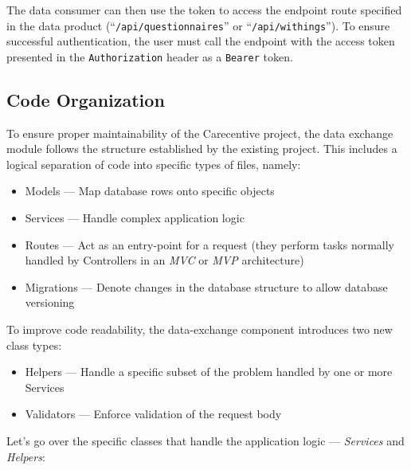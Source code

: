 The data consumer can then use the token to access the endpoint route specified in the data product (``\texttt{/api/questionnaires}'' or ``\texttt{/api/withings}'').
To ensure successful authentication, the user must call the endpoint with the access token presented in the \texttt{Authorization} header as a \texttt{Bearer} token.

\subsection{Code Organization}\label{subsec:code-organization}

To ensure proper maintainability of the Carecentive project, the data exchange module follows the structure established by the existing project.
This includes a logical separation of code into specific types of files, namely:
\begin{itemize}
    \item Models --- Map database rows onto specific objects
    \item Services --- Handle complex application logic
    \item Routes --- Act as an entry-point for a request (they perform tasks normally handled by Controllers in an \textit{MVC} or \textit{MVP} architecture)
    \item Migrations --- Denote changes in the database structure to allow database versioning
\end{itemize}

To improve code readability, the data-exchange component introduces two new class types:
\begin{itemize}
    \item Helpers --- Handle a specific subset of the problem handled by one or more Services
    \item Validators --- Enforce validation of the request body
\end{itemize}

Let's go over the specific classes that handle the application logic --- \textit{Services} and \textit{Helpers}:

